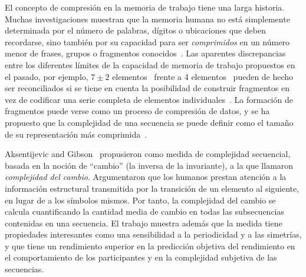 El concepto de compresión en la memoria de trabajo tiene una larga historia. Muchas investigaciones muestran que la memoria humana no está simplemente determinada por el número de palabras, dígitos o ubicaciones que deben recordarse, sino también por su capacidad para ser \textit{comprimidos} en un número menor de frases, grupos o fragmentos conocidos~\cite{f23,f24,f25,f26,feldman2000minimization,f28,f29}. Las aparentes discrepancias entre los diferentes límites de la capacidad de memoria de trabajo propuestos en el pasado, por ejemplo, $7\pm 2$ elementos~\cite{f29} frente a 4 elementos~\cite{f25,f30} pueden de hecho ser reconciliados si se tiene en cuenta la posibilidad de construir fragmentos en vez de codificar una serie completa de elementos individuales~\cite{f16,f31}. La formación de fragmentos puede verse como un proceso de compresión de datos, y se ha propuesto que la complejidad de una secuencia se puede definir como el tamaño de su representación más comprimida~\cite{f16,f32,f33,f34}.


Aksentijevic and Gibson~\cite{f47} propusieron como medida de complejidad secuencial, basada en la noción de ``cambio'' (la inversa de la invariante), a la que llamaron \textit{complejidad del cambio}. Argumentaron que los humanos prestan atención a la información estructural transmitida por la transición de un elemento al siguiente, en lugar de a los símbolos mismos. Por tanto, la complejidad del cambio se calcula cuantificando la cantidad media de cambio en todas las subsecuencias contenidas en una secuencia. El trabajo muestra además que la medida tiene propiedades interesantes como una sensibilidad a la periodicidad y a las simetrías, y que tiene un rendimiento superior en la predicción objetiva del rendimiento en el comportamiento de los participantes y en la complejidad subjetiva de las secuencias.

